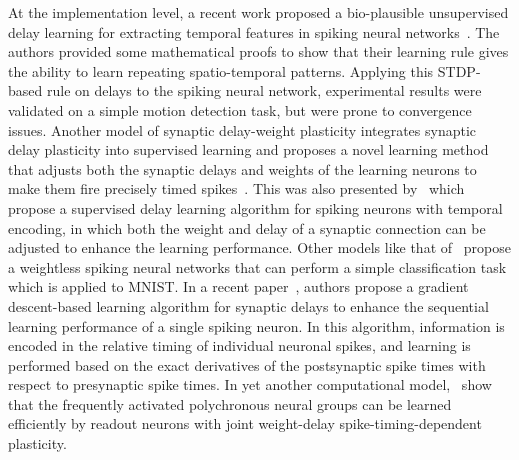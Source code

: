 \documentclass[brainsci, %
               review,submit,pdftex,moreauthors
               ]{Definitions/mdpi}
\begin{document}
At the implementation level, a recent work proposed a bio-plausible unsupervised delay learning for extracting temporal features in spiking neural networks~\citep{nadafian_bio-plausible_2020}. The authors provided some mathematical proofs to show that their learning rule gives the ability to learn repeating spatio-temporal patterns. Applying this STDP-based rule on delays to the spiking neural network, experimental results were validated on a simple motion detection task, but were prone to convergence issues. Another model of synaptic delay-weight plasticity integrates synaptic delay plasticity into supervised learning and proposes a novel learning method that adjusts both the synaptic delays and weights of the learning neurons to make them fire precisely timed spikes~\citep{zhang_supervised_2020}. This was also presented by~\citep{wang_delay_2019} which propose a supervised delay learning algorithm for spiking neurons with temporal encoding, in which both the weight and delay of a synaptic connection can be adjusted to enhance the learning performance. Other models like that of~\citep{hazan_memory_2022} propose a weightless spiking neural networks that can perform a simple classification task which is applied to MNIST. In a recent paper~\citep{luo_supervised_2022}, authors propose a gradient descent-based learning algorithm for synaptic delays to enhance the sequential learning performance of a single spiking neuron. In this algorithm, information is encoded in the relative timing of individual neuronal spikes, and learning is performed based on the exact derivatives of the postsynaptic spike times with respect to presynaptic spike times.
In yet another computational model,~\citet{sun_learning_2016} show that the frequently activated polychronous neural groups can be learned efficiently by readout neurons with joint weight-delay spike-timing-dependent plasticity.

\end{document}
